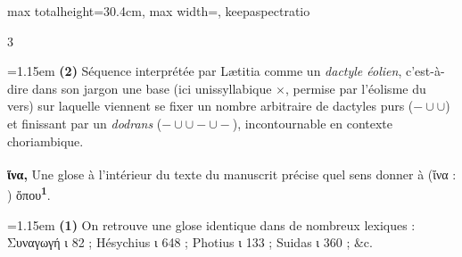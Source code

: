 \documentclass[11pt,twoside]{book}
\newcommand{\currHeadLE}{}
\newcommand{\currHeadRE}{}
\newcommand{\currHeadLO}{}
\newcommand{\currHeadRO}{}
\newcommand{\italique}[1]{\textit{#1}}
\newcommand{\R}{\textbf{R}}
\newcommand{\marqueur}[1]{\textsuperscript{\color{rubricRed}\textbf{#1}}}
\begin{document}
\begin{adjustbox}{max totalheight=30.4cm, max width=\textwidth, keepaspectratio}
\begin{minipage}{\textwidth}
{\begin{multicols}{3}
\par\vspace{1.5pt}
\noindent\hangindent=1.15em {\color{sepiaNote}\textbf{(2)}} Séquence interprétée par Lætitia comme un \italique{dactyle éolien}, c'est-à-dire dans son jargon une base (ici unissyllabique $ \times $, permise par l'éolisme du vers) sur laquelle viennent se fixer un nombre arbitraire de dactyles purs ($ - \cup \cup $) et finissant par un \italique{dodrans} ($ - \cup \cup - \cup - $), incontournable en contexte choriambique.
\par\vspace{1.5pt}
 \textbf{ἵνα,} Une glose à l'intérieur du texte du manuscrit\marqueur{} précise quel sens donner à (ἵνα : ) ὅπου\marqueur{1}.
\par\vspace{1.5pt}
\par\vspace{1.2pt}\par\nopagebreak\vspace{1pt}\noindent\hangindent=1.15em {\color{sepiaNote}\textbf{(1)}} On retrouve une glose identique dans de nombreux lexiques : Συναγωγή ι 82 ; Hésychius ι 648 ; Photius ι 133 ; Suidas ι 360 ; \&c.
\par\end{multicols}}
\end{minipage}\end{adjustbox}
\clearpage\ifodd\value{page}\hbox{}\newpage\fi
\renewcommand{\currHeadLE}{ΑΡΙΣΤΟΦΑΝΟΥΣ ΘΕΣΜΟΦΟΡΙΑΖΟΥΣΑΙ · CODEX RAVENNAS 429 (\R)}
\renewcommand{\currHeadRE}{Folio f. 176v (Classense 178v) · vv. 1169–1210}
\renewcommand{\currHeadLO}{FAC-SIMILÉ DU CODEX RAVENNAS 429 (\R) · f. 176v (Classense 178v)}
\renewcommand{\currHeadRO}{vv. 1169–1210 · Planche recadrée sur la zone écrite et harmonisée}
\end{document}
